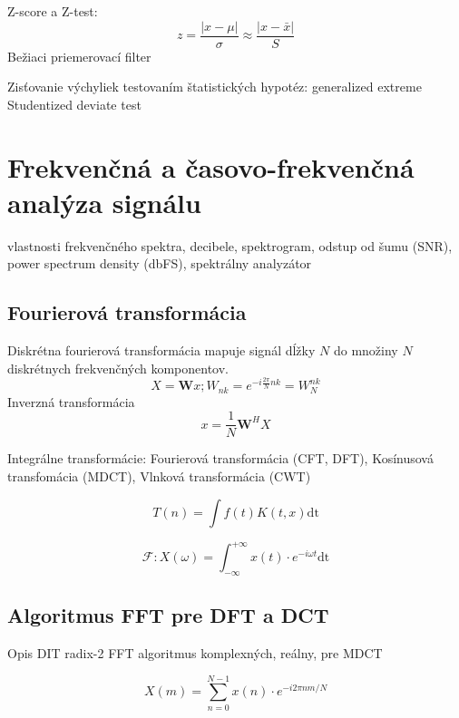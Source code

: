 Z-score a Z-test:
\begin{equation}
z = \frac{|x - \mu|}{\sigma} \approx \frac{|x - \bar{x}|}{S}
\end{equation}
Bežiaci priemerovací filter \cite{anomaly-detection-models}

Zisťovanie výchyliek testovaním štatistických hypotéz:
generalized extreme Studentized deviate test \cite{generalized-esd}


\section{Frekvenčná a časovo-frekvenčná analýza signálu}
\cite{time-series-analysis}
vlastnosti frekvenčného spektra, decibele, spektrogram, odstup od šumu (SNR), power spectrum density (dbFS), spektrálny analyzátor

\subsection{Fourierová transformácia}
Diskrétna fourierová transformácia mapuje signál dĺžky $N$ do množiny $N$ diskrétnych frekvenčných komponentov. \cite{signal-processing}
\begin{equation}
X = \mathbf{W}x; W_{nk} = e^{-i\frac{2\pi}{N}nk} = W_N^{nk}
\end{equation}
Inverzná transformácia
\begin{equation}
x = \frac{1}{N}\mathbf{W}^H X
\end{equation}

Integrálne transformácie: Fourierová transformácia (CFT, DFT), Kosínusová transfomácia (MDCT), Vlnková transformácia (CWT) \cite{dct} \cite{casove-frekvencia-analyza-signalu}

\begin{equation}
T(n) = \int{f(t) K(t,x) \mathrm{dt}}
\end{equation}

\begin{equation}
\mathcal{F}: X(\omega) = \int_{-\infty}^{+\infty}{x(t) \cdot e^{-i\omega t} \mathrm{dt}}
\end{equation}

\subsection{Algoritmus FFT pre DFT a DCT}
Opis DIT radix-2 FFT algoritmus komplexných, reálny, pre MDCT \cite{fft-blackbox}

\begin{equation}
X(m) = \sum_{n = 0}^{N-1}{x(n) \cdot e^{-i2\pi n m / N}}
\end{equation}

